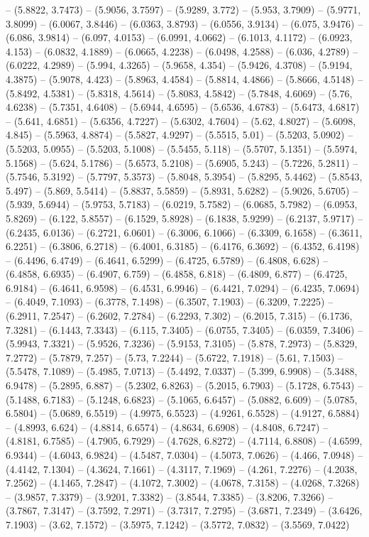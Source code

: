 -- (5.8822, 3.7473) -- (5.9056, 3.7597) -- (5.9289, 3.772) -- (5.953, 3.7909) -- (5.9771, 3.8099) -- (6.0067, 3.8446) -- (6.0363, 3.8793) -- (6.0556, 3.9134) -- (6.075, 3.9476) -- (6.086, 3.9814) -- (6.097, 4.0153) -- (6.0991, 4.0662) -- (6.1013, 4.1172) -- (6.0923, 4.153) -- (6.0832, 4.1889) -- (6.0665, 4.2238) -- (6.0498, 4.2588) -- (6.036, 4.2789) -- (6.0222, 4.2989) -- (5.994, 4.3265) -- (5.9658, 4.354) -- (5.9426, 4.3708) -- (5.9194, 4.3875) -- (5.9078, 4.423) -- (5.8963, 4.4584) -- (5.8814, 4.4866) -- (5.8666, 4.5148) -- (5.8492, 4.5381) -- (5.8318, 4.5614) -- (5.8083, 4.5842) -- (5.7848, 4.6069) -- (5.76, 4.6238) -- (5.7351, 4.6408) -- (5.6944, 4.6595) -- (5.6536, 4.6783) -- (5.6473, 4.6817) -- (5.641, 4.6851) -- (5.6356, 4.7227) -- (5.6302, 4.7604) -- (5.62, 4.8027) -- (5.6098, 4.845) -- (5.5963, 4.8874) -- (5.5827, 4.9297) -- (5.5515, 5.01) -- (5.5203, 5.0902) -- (5.5203, 5.0955) -- (5.5203, 5.1008) -- (5.5455, 5.118) -- (5.5707, 5.1351) -- (5.5974, 5.1568) -- (5.624, 5.1786) -- (5.6573, 5.2108) -- (5.6905, 5.243) -- (5.7226, 5.2811) -- (5.7546, 5.3192) -- (5.7797, 5.3573) -- (5.8048, 5.3954) -- (5.8295, 5.4462) -- (5.8543, 5.497) -- (5.869, 5.5414) -- (5.8837, 5.5859) -- (5.8931, 5.6282) -- (5.9026, 5.6705) -- (5.939, 5.6944) -- (5.9753, 5.7183) -- (6.0219, 5.7582) -- (6.0685, 5.7982) -- (6.0953, 5.8269) -- (6.122, 5.8557) -- (6.1529, 5.8928) -- (6.1838, 5.9299) -- (6.2137, 5.9717) -- (6.2435, 6.0136) -- (6.2721, 6.0601) -- (6.3006, 6.1066) -- (6.3309, 6.1658) -- (6.3611, 6.2251) -- (6.3806, 6.2718) -- (6.4001, 6.3185) -- (6.4176, 6.3692) -- (6.4352, 6.4198) -- (6.4496, 6.4749) -- (6.4641, 6.5299) -- (6.4725, 6.5789) -- (6.4808, 6.628) -- (6.4858, 6.6935) -- (6.4907, 6.759) -- (6.4858, 6.818) -- (6.4809, 6.877) -- (6.4725, 6.9184) -- (6.4641, 6.9598) -- (6.4531, 6.9946) -- (6.4421, 7.0294) -- (6.4235, 7.0694) -- (6.4049, 7.1093) -- (6.3778, 7.1498) -- (6.3507, 7.1903) -- (6.3209, 7.2225) -- (6.2911, 7.2547) -- (6.2602, 7.2784) -- (6.2293, 7.302) -- (6.2015, 7.315) -- (6.1736, 7.3281) -- (6.1443, 7.3343) -- (6.115, 7.3405) -- (6.0755, 7.3405) -- (6.0359, 7.3406) -- (5.9943, 7.3321) -- (5.9526, 7.3236) -- (5.9153, 7.3105) -- (5.878, 7.2973) -- (5.8329, 7.2772) -- (5.7879, 7.257) -- (5.73, 7.2244) -- (5.6722, 7.1918) -- (5.61, 7.1503) -- (5.5478, 7.1089) -- (5.4985, 7.0713) -- (5.4492, 7.0337) -- (5.399, 6.9908) -- (5.3488, 6.9478) -- (5.2895, 6.887) -- (5.2302, 6.8263) -- (5.2015, 6.7903) -- (5.1728, 6.7543) -- (5.1488, 6.7183) -- (5.1248, 6.6823) -- (5.1065, 6.6457) -- (5.0882, 6.609) -- (5.0785, 6.5804) -- (5.0689, 6.5519) -- (4.9975, 6.5523) -- (4.9261, 6.5528) -- (4.9127, 6.5884) -- (4.8993, 6.624) -- (4.8814, 6.6574) -- (4.8634, 6.6908) -- (4.8408, 6.7247) -- (4.8181, 6.7585) -- (4.7905, 6.7929) -- (4.7628, 6.8272) -- (4.7114, 6.8808) -- (4.6599, 6.9344) -- (4.6043, 6.9824) -- (4.5487, 7.0304) -- (4.5073, 7.0626) -- (4.466, 7.0948) -- (4.4142, 7.1304) -- (4.3624, 7.1661) -- (4.3117, 7.1969) -- (4.261, 7.2276) -- (4.2038, 7.2562) -- (4.1465, 7.2847) -- (4.1072, 7.3002) -- (4.0678, 7.3158) -- (4.0268, 7.3268) -- (3.9857, 7.3379) -- (3.9201, 7.3382) -- (3.8544, 7.3385) -- (3.8206, 7.3266) -- (3.7867, 7.3147) -- (3.7592, 7.2971) -- (3.7317, 7.2795) -- (3.6871, 7.2349) -- (3.6426, 7.1903) -- (3.62, 7.1572) -- (3.5975, 7.1242) -- (3.5772, 7.0832) -- (3.5569, 7.0422) 